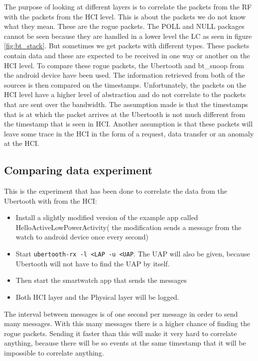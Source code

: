 The purpose of looking at different layers is to correlate the packets from the RF with the packets from the HCI level. This is about the packets we do not know what they mean. These are the rogue packets. The POLL and NULL packages cannot be seen because they are handled in a lower level the LC as seen in figure \ref{fig:bt_stack}. But sometimes we get packets with different types. These packets contain data and these are expected to be received in one way or another on the HCI level. To compare these rogue packets, the Ubertooth and bt\_snoop from the android device have been used. The information retrieved from both of the sources is then compared on the timestamps. Unfortunately, the packets on the HCI level have a higher level of abstraction and do not correlate to the packets that are sent over the bandwidth. The assumption made is that the timestamps that is at which the packet arrives at the Ubertooth is not much different from the timestamp that is seen in HCI. Another assumption is that these packets will leave some trace in the HCI in the form of a request, data transfer or an anomaly at the HCI.
\subsection{Comparing data experiment}
This is the experiment that has been done to correlate the data from the Ubertooth with from the HCI:
\begin{itemize}
\item Install a slightly modified version of the example app called HelloActiveLowPowerActivity( the modification sends a message from the watch to android device once every second)
\item Start \verb|ubertooth-rx -l <LAP -u <UAP|. The UAP will also be given, because Ubertooth will not have to find the UAP by itself. 
\item Then start the smartwatch app that sends the messages
\item Both HCI layer and the Physical layer will be logged.
\end{itemize}
The interval between messages is of one second per message in order to send many messages. With this many messages there is a higher chance of finding the rogue packets. Sending it faster than this will make it very hard to correlate anything, because there will be so events at the same timestamp that it will be impossible to correlate anything.
